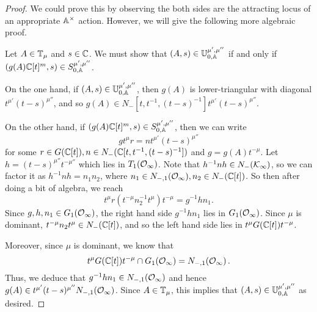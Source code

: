 \documentclass{article} %
\begin{document}
% 
% 
\begin{proof}
We could prove this by observing the both sides are the attracting locus of an appropriate $ \AA^\times$ action. However, we will give the following more algebraic proof.

Let $ A \in \TT_\mu$ and $ s \in \CC $. We must show that  $ (A,s) \in \UU^{\mu', \mu''}_{0,\AA} $ if and only if $ (g(A)\CC[t]^m,s) \in S^{\mu', \mu''}_{0,\AA} $. 

On the one hand, if $ (A,s) \in \UU^{\mu', \mu''}_{0,\AA} $, then $ g(A)$ is lower-triangular with diagonal $ t^{\mu'} (t-s)^{\mu''}$, and so $ g(A) \in N_-[t, t^{-1}, (t-s)^{-1}] t^{\mu'} (t-s)^{\mu''}$. 

On the other hand, if $ (g(A)\CC[t]^m, s) \in S^{\mu', \mu''}_{0,\AA}$, then we can write 
$$
    g t^\mu r= n t^{\mu'} (t-s)^{\mu''}
$$
for some $ r \in G(\CC[t]), n \in N_-(\CC[t, t^{-1}, (t-s)^{-1}]) $ and $ g = g(A)t^{-\mu}$.  Let $ h = (t-s)^{\mu''} t^{-\mu''}$ which lies in $ T_1(\Oinf) $. %
Note that $ h^{-1}n h \in N_-(\Kinf)$, 
so we can factor it as $ h^{-1} n h  = n_1 n_2 $, where $ n_1 \in N_{-,1}(\Oinf), n_2 \in N_-(\CC[t])$.  So then after doing a bit of algebra, we reach
$$
    t^\mu r (t^{-\mu} n_2^{-1} t^\mu) t^{-\mu} = g^{-1} h n_1.
$$
Since $ g, h, n_1 \in G_1(\Oinf)$, the right hand side $ g^{-1} h n_1 $ lies in $ G_1(\Oinf) $.  Since $ \mu $ is dominant, $ t^{-\mu} n_2 t^\mu \in N_-(\CC[t])$, and so the left hand side lies in $t^\mu G(\CC[t]) t^{-\mu}$.

Moreover, since $ \mu $ is dominant, we know that 
$$
    t^\mu G(\CC[t]) t^{-\mu} \cap G_1(\Oinf) = N_{-,1}(\Oinf)\,.
$$
Thus, we deduce that $ g^{-1} h n_1 \in N_{-,1}(\Oinf)$ 
and hence $ g(A) \in t^{\mu'} (t-s)^{\mu''}N_{-,1}(\Oinf) $.  
Since $ A \in \TT_\mu $, this implies that $ (A,s) \in \UU^{\mu', \mu''}_{0,\AA}$ as desired.
\end{proof}
% 
% 
% 
% 
\end{document}
